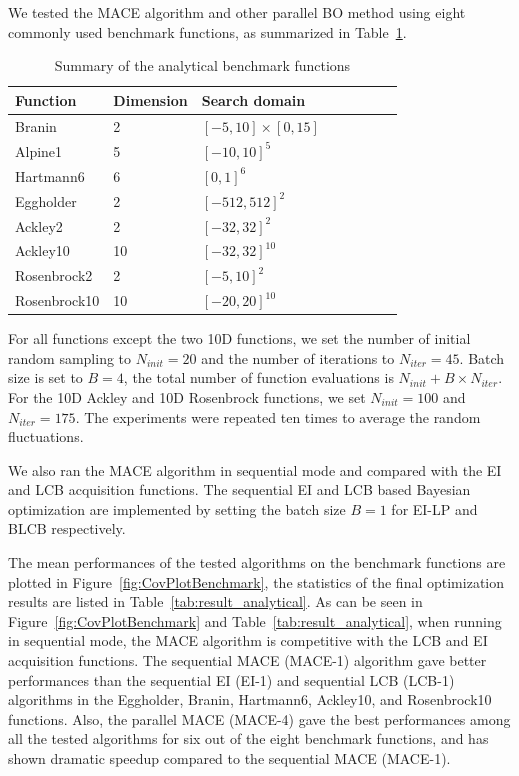 We tested the MACE algorithm and other parallel BO method using eight commonly used benchmark
functions, as summarized in Table~\ref{tab:summaryanalygical}.

\begin{table}[htbp]
    \centering
    \caption{Summary of the analytical benchmark functions}
    \label{tab:summaryanalygical}
    \begin{tabular}{llllllll}
        \toprule
         Function           & Dimension        & Search domain             \\ \midrule
         Branin             & 2                & $[-5,  10]\times[0, 15]$  \\
         Alpine1            & 5                & $[-10, 10]^5$             \\
         Hartmann6          & 6                & $[0,   1]^6$              \\
         Eggholder          & 2                & $[-512, 512]^2$           \\
         Ackley2            & 2                & $[-32, 32]^2$             \\
         Ackley10           & 10               & $[-32, 32]^{10}$          \\
         Rosenbrock2        & 2                & $[-5,  10]^2$             \\
         Rosenbrock10       & 10               & $[-20, 20]^{10}$          \\
        \bottomrule
    \end{tabular}
    \vskip -0.2in
\end{table}

For all functions except the two 10D functions, we set the number of initial
random sampling to $N_{init} = 20$ and the number of iterations to $N_{iter} =
45$. Batch size is set to $B = 4$, the total number of function evaluations is
$N_{init} + B \times N_{iter}$. For the 10D Ackley and 10D Rosenbrock functions, we set
$N_{init} = 100$ and $N_{iter} = 175$. The experiments were repeated ten
times to average the random fluctuations.

We also ran the MACE algorithm in sequential mode and compared with the EI and LCB
acquisition functions. The sequential EI and LCB based Bayesian optimization
are implemented by setting the batch size $B = 1$ for EI-LP and BLCB
respectively.


The mean performances of the tested algorithms on the benchmark functions are
plotted in Figure~\ref{fig:CovPlotBenchmark}, the statistics of the final
optimization results are listed in Table~\ref{tab:result_analytical}. As can be
seen in Figure~\ref{fig:CovPlotBenchmark} and
Table~\ref{tab:result_analytical}, when running in sequential mode, the MACE
algorithm is competitive with the LCB and EI acquisition functions. The sequential MACE (MACE-1)
algorithm gave better performances than the sequential EI (EI-1) and sequential LCB (LCB-1) algorithms in the Eggholder,
Branin, Hartmann6, Ackley10, and Rosenbrock10 functions. Also, the parallel
MACE (MACE-4) gave the best performances among all the tested algorithms for
six out of the eight benchmark functions, and has shown dramatic speedup
compared to the sequential MACE (MACE-1).


